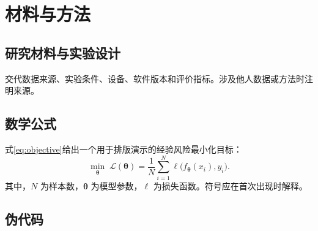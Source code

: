 \section{材料与方法}\label{sec:methods}
\subsection{研究材料与实验设计}
交代数据来源、实验条件、设备、软件版本和评价指标。涉及他人数据或方法时注明来源。
\subsection{数学公式}
式\eqref{eq:objective}给出一个用于排版演示的经验风险最小化目标：
\begin{equation}
  \min_{\boldsymbol{\theta}}\;\mathcal{L}(\boldsymbol{\theta})
  =\frac{1}{N}\sum_{i=1}^{N}\ell\bigl(f_{\boldsymbol{\theta}}(x_i),y_i\bigr).
  \label{eq:objective}
\end{equation}
其中，$N$ 为样本数，$\boldsymbol{\theta}$ 为模型参数，$\ell$ 为损失函数。符号应在首次出现时解释。
\subsection{伪代码}
\begin{algorithm}[htbp]
\caption{梯度下降流程示例}\label{alg:demo}
\end{algorithm}
